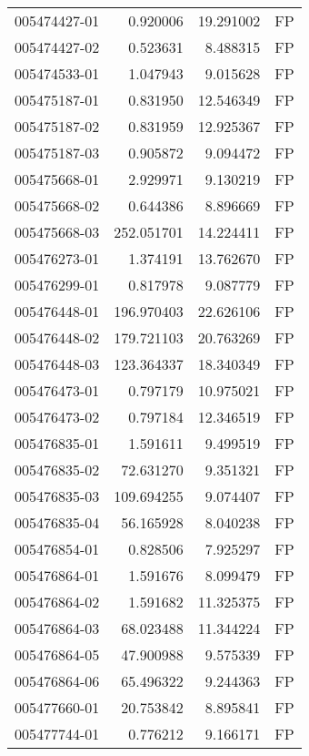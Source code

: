 \begin{tabular}{lrrl}
005474427-01 &    0.920006 &      19.291002 &   FP \\
005474427-02 &    0.523631 &       8.488315 &   FP \\
005474533-01 &    1.047943 &       9.015628 &   FP \\
005475187-01 &    0.831950 &      12.546349 &   FP \\
005475187-02 &    0.831959 &      12.925367 &   FP \\
005475187-03 &    0.905872 &       9.094472 &   FP \\
005475668-01 &    2.929971 &       9.130219 &   FP \\
005475668-02 &    0.644386 &       8.896669 &   FP \\
005475668-03 &  252.051701 &      14.224411 &   FP \\
005476273-01 &    1.374191 &      13.762670 &   FP \\
005476299-01 &    0.817978 &       9.087779 &   FP \\
005476448-01 &  196.970403 &      22.626106 &   FP \\
005476448-02 &  179.721103 &      20.763269 &   FP \\
005476448-03 &  123.364337 &      18.340349 &   FP \\
005476473-01 &    0.797179 &      10.975021 &   FP \\
005476473-02 &    0.797184 &      12.346519 &   FP \\
005476835-01 &    1.591611 &       9.499519 &   FP \\
005476835-02 &   72.631270 &       9.351321 &   FP \\
005476835-03 &  109.694255 &       9.074407 &   FP \\
005476835-04 &   56.165928 &       8.040238 &   FP \\
005476854-01 &    0.828506 &       7.925297 &   FP \\
005476864-01 &    1.591676 &       8.099479 &   FP \\
005476864-02 &    1.591682 &      11.325375 &   FP \\
005476864-03 &   68.023488 &      11.344224 &   FP \\
005476864-05 &   47.900988 &       9.575339 &   FP \\
005476864-06 &   65.496322 &       9.244363 &   FP \\
005477660-01 &   20.753842 &       8.895841 &   FP \\
005477744-01 &    0.776212 &       9.166171 &   FP \\

\end{tabular}
